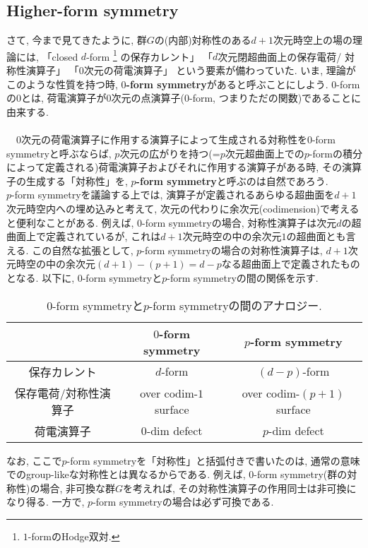 \documentclass{ltjsarticle}
\theoremstyle{mystyle} %
\numberwithin{equation}{section}
\begin{document}
\subsection{Higher-form symmetry}
さて, 今まで見てきたように, 群$G$の(内部)対称性のある$d+1$次元時空上の場の理論には, 
「closed $d$-form
\footnote{$1$-formのHodge双対. }
の保存カレント」
「$d$次元閉超曲面上の保存電荷/ 対称性演算子」
「$0$次元の荷電演算子」
という要素が備わっていた. 
いま, 理論がこのような性質を持つ時, \textbf{$0$-form symmetry}があると呼ぶことにしよう. 
$0$-formの$0$とは, 荷電演算子が$0$次元の点演算子($0$-form, つまりただの関数)であることに由来する. \\\\
　$0$次元の荷電演算子に作用する演算子によって生成される対称性を$0$-form symmetryと呼ぶならば, 
$p$次元の広がりを持つ(=$p$次元超曲面上での$p$-formの積分によって定義される)荷電演算子およびそれに作用する演算子がある時, 
その演算子の生成する「対称性」を, \textbf{$p$-form symmetry}と呼ぶのは自然であろう. \\
$p$-form symmetryを議論する上では, 演算子が定義されるあらゆる超曲面を$d+1$次元時空内への埋め込みと考えて, 
次元の代わりに余次元(codimension)で考えると便利なことがある. 例えば, 
$0$-form symmetryの場合, 対称性演算子は次元$d$の超曲面上で定義されているが, 
これは$d+1$次元時空の中の余次元$1$の超曲面とも言える. 
この自然な拡張として, $p$-form symmetryの場合の対称性演算子は, 
$d+1$次元時空の中の余次元$(d+1)-(p+1)=d-p$なる超曲面上で定義されたものとなる. 
以下に, $0$-form symmetryと$p$-form symmetryの間の関係を示す. \\
\begin{table}[H]
    \centering
    \begin{tabular}{|c|c|c|}
        \hline
         & $0$-form symmetry & $p$-form symmetry \\
        \hline
        保存カレント & $d$-form & $(d-p)$-form \\
        \hline
        保存電荷/対称性演算子 & over codim-$1$ surface& over codim-$(p+1)$ surface\\
        \hline
        荷電演算子 & $0$-dim defect & $p$-dim defect \\
        \hline
    \end{tabular}
    \caption{$0$-form symmetryと$p$-form symmetryの間のアナロジー. }
    \label{tab:label}
\end{table}
なお, ここで$p$-form symmetryを「対称性」と括弧付きで書いたのは, 
通常の意味でのgroup-likeな対称性とは異なるからである. 
例えば, $0$-form symmetry(群の対称性)の場合, 
非可換な群$G$を考えれば, その対称性演算子の作用同士は非可換になり得る. 
一方で, $p$-form symmetryの場合は必ず可換である. 
\end{document}
